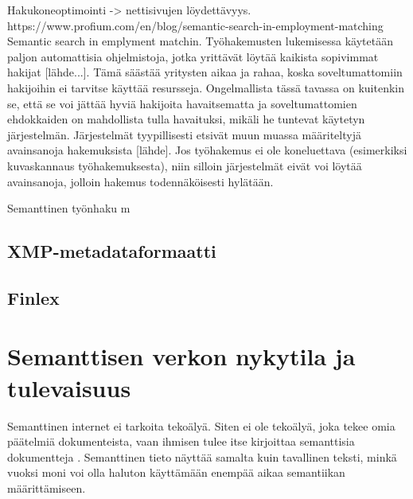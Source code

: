 \documentclass[finnish, 12pt, a4paper, elec, utf8, pdfa, online]{aaltothesis}
\begin{document}
Hakukoneoptimointi -> nettisivujen löydettävyys.
https://www.profium.com/en/blog/semantic-search-in-employment-matching
Semantic search in emplyment matchin.
Työhakemusten lukemisessa käytetään paljon automattisia ohjelmistoja, jotka yrittävät löytää kaikista sopivimmat hakijat [lähde...]. Tämä säästää yritysten aikaa ja rahaa, koska soveltumattomiin hakijoihin ei tarvitse käyttää resursseja. Ongelmallista tässä tavassa on kuitenkin se, että se voi jättää hyviä hakijoita havaitsematta ja soveltumattomien ehdokkaiden on mahdollista tulla havaituksi, mikäli he tuntevat käytetyn järjestelmän. Järjestelmät tyypillisesti etsivät muun muassa määriteltyjä avainsanoja hakemuksista [lähde]. Jos työhakemus ei ole koneluettava (esimerkiksi kuvaskannaus työhakemuksesta), niin silloin järjestelmät eivät voi löytää avainsanoja, jolloin hakemus todennäköisesti hylätään.

Semanttinen työnhaku m


\subsection{XMP-metadataformaatti}
\subsection{Finlex}

\clearpage
\section{Semanttisen verkon nykytila ja tulevaisuus}





Semanttinen internet ei tarkoita tekoälyä. Siten ei ole tekoälyä, joka tekee omia päätelmiä dokumenteista, vaan ihmisen tulee itse kirjoittaa semanttisia dokumentteja \cite{Semantic_Web_represent}. Semanttinen tieto näyttää samalta kuin tavallinen teksti, minkä vuoksi moni voi olla haluton käyttämään enempää aikaa semantiikan määrittämiseen.
\end{document}

